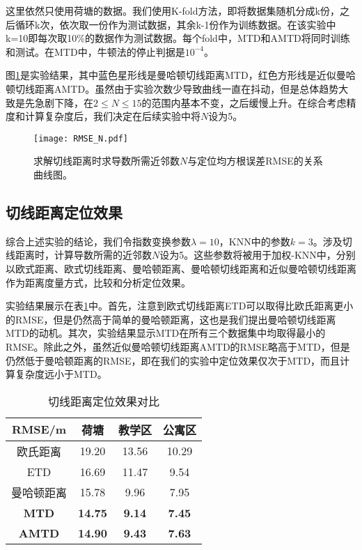 这里依然只使用荷塘的数据。我们使用K-fold方法，即将数据集随机分成k份，之后循环k次，依次取一份作为测试数据，其余k-1份作为训练数据。在该实验中k=10即每次取10\%的数据作为测试数据。每个fold中，MTD和AMTD将同时训练和测试。在MTD中，牛顿法的停止判据是$10^{-4}$。

图\ref{fig:rmse_n}是实验结果，其中蓝色星形线是曼哈顿切线距离MTD，红色方形线是近似曼哈顿切线距离AMTD。虽然由于实验次数少导致曲线一直在抖动，但是总体趋势大致是先急剧下降，在$2 \le N \le 15$的范围内基本不变，之后缓慢上升。在综合考虑精度和计算复杂度后，我们决定在后续实验中将$N$设为5。

\begin{figure}[htb]
	\centering
	\texttt{[image: RMSE\_N.pdf]}
	\caption{求解切线距离时求导数所需近邻数$N$与定位均方根误差RMSE的关系曲线图。}
	\label{fig:rmse_n}
\end{figure}

\subsection{切线距离定位效果}

综合上述实验的结论，我们令指数变换参数$\lambda=10$，KNN中的参数$k=3$。涉及切线距离时，计算导数所需的近邻数$N$设为5。这些参数将被用于加权-KNN中，分别以欧式距离、欧式切线距离、曼哈顿距离、曼哈顿切线距离和近似曼哈顿切线距离作为距离度量方式，比较和分析定位效果。

实验结果展示在表\ref{tab:td}中。首先，注意到欧式切线距离ETD可以取得比欧氏距离更小的RMSE，但是仍然高于简单的曼哈顿距离，这也是我们提出曼哈顿切线距离MTD的动机。其次，实验结果显示MTD在所有三个数据集中均取得最小的RMSE。除此之外，虽然近似曼哈顿切线距离AMTD的RMSE略高于MTD，但是仍然低于曼哈顿距离的RMSE，即在我们的实验中定位效果仅次于MTD，而且计算复杂度远小于MTD。

\begin{table}[htb]
	\caption{切线距离定位效果对比}
	\begin{center}
		\begin{tabular}{cccc}
			\toprule
			RMSE/m &  荷塘 & 教学区 & 公寓区 \\
			\midrule
			欧氏距离 & 19.20 & 13.56 & 10.29 \\
			\midrule
			ETD & 16.69 & 11.47 & 9.54 \\
			\midrule
			曼哈顿距离 & 15.78 & 9.96 & 7.95 \\
			\midrule
			\textbf{MTD} & \textbf{14.75} & \textbf{9.14} & \textbf{7.45} \\
			\midrule
			\textbf{AMTD} & \textbf{14.90} & \textbf{9.43} & \textbf{7.63} \\
			\bottomrule
		\end{tabular}
		\label{tab:td}
	\end{center}
\end{table}

